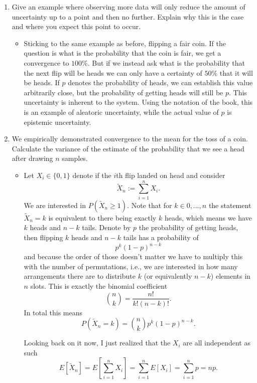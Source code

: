 \documentclass{article}
\begin{document}
\begin{enumerate}
	\item Give an example where observing more data will only reduce the amount of uncertainty up to a point and then no further. Explain why this is the case and where you expect this point to occur.
	\begin{itemize}
		\item Sticking to the same example as before, flipping a fair coin. If the question is what is the probability that the coin is fair, we get a convergence to $100\%$. But if we instead ask what is the probability that the next flip will be heads we can only have a certainty of $50\%$ that it will be heads. If $p$ denotes the probability of heads, we can establish this value arbitrarily close, but the probability of getting heads will still be $p$. This uncertainty is inherent to the system. Using the notation of the book, this is an example of aleatoric uncertainty, while the actual value of $p$ is epistemic uncertainty.
	\end{itemize}
	\item We empirically demonstrated convergence to the mean for the toss of a coin. Calculate the variance of the estimate of the probability that we see a head after drawing $n$ samples.
		\begin{itemize}
			\item Let $X_i \in \{0, 1\}$ denote if the $i$th flip landed on head and consider 
			$$
			\tilde{X}_n := \sum_{i = 1}^n X_i.
			$$
			We are interested in $P(\tilde{X}_n \geq 1)$. Note that for $k \in {0, \dots, n}$ the statement $\tilde{X}_n = k$ is equivalent to there being exactly $k$ heads, which means we have $k$ heads and $n - k$ tails. Denote by $p$ the probability of getting heads, then flipping $k$ heads and $n - k$ tails has a probability of
			$$
			p^k (1 - p)^{n - k}
			$$
			and because the order of those doesn't matter we have to multiply this with the number of permutations, i.e., we are interested in how many arrangements there are to distribute $k$ (or equivalently $n - k$) elements in $n$ slots. This is exactly the binomial coefficient
			$$
			\binom{n}{k} = \frac{n!}{k! (n - k)!}.
			$$
			In total this means
			$$
			P(\tilde{X}_n = k) = \binom{n}{k} p^k (1 - p)^{n - k}.
			$$

			Looking back on it now, I just realized that the $X_i$ are all independent as such
			$$
			E[\tilde{X}_n] = E\left[\sum_{i = 1}^n X_i\right] = \sum_{i = 1}^n E[X_i] = \sum_{i = 1}^n p = np.
			$$


\end{itemize}
\end{enumerate}
\end{document}
